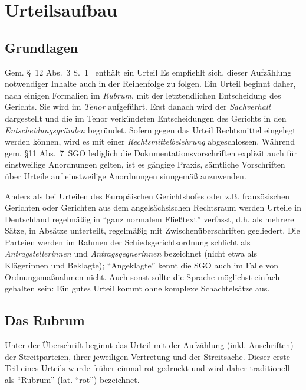 
\chapter{Urteilsaufbau}

\section{Grundlagen}
Gem. \S~12 Abs.~3 S.~1~ enthält ein Urteil  Es empfiehlt sich, dieser Aufzählung notwendiger Inhalte auch in der Reihenfolge zu folgen. Ein Urteil beginnt daher, nach einigen Formalien im \emph{Rubrum}, mit der letztendlichen Entscheidung des Gerichts. Sie wird im \emph{Tenor} aufgeführt. Erst danach wird der \emph{Sachverhalt} dargestellt und die im Tenor verkündeten Entscheidungen des Gerichts in den \emph{Entscheidungsgründen} begründet. Sofern gegen das Urteil Rechtsmittel eingelegt werden können, wird es mit einer \emph{Rechtsmittelbelehrung} abgeschlossen. Während gem. \S11 Abs.~7~SGO lediglich die Dokumentationsvorschriften explizit auch für einstweilige Anordnungen gelten, ist es gängige Praxis, sämtliche Vorschriften über Urteile auf einstweilige Anordnungen sinngemäß anzuwenden.

Anders als bei Urteilen des Europäischen Gerichtshofes oder z.B. französischen Gerichten oder Gerichten aus dem angelsächsischen Rechtsraum werden Urteile in Deutschland regelmäßig in \enquote{ganz normalem Fließtext} verfasst, d.h. als mehrere Sätze, in Absätze unterteilt, regelmäßig mit Zwischenüberschriften gegliedert. Die Parteien werden im Rahmen der Schiedsgerichtsordnung schlicht als \emph{Antragstellerinnen} und \emph{Antragsgegnerinnen} bezeichnet (nicht etwa als Klägerinnen und Beklagte); \enquote{Angeklagte} kennt die SGO auch im Falle von Ordnungsmaßnahmen nicht. Auch sonst sollte die Sprache möglichst einfach gehalten sein: Ein gutes Urteil kommt ohne komplexe Schachtelsätze aus.

\section{Das Rubrum}
Unter der Überschrift  beginnt das Urteil mit der Aufzählung (inkl. Anschriften) der Streitparteien, ihrer jeweiligen Vertretung und der Streitsache. Dieser erste Teil eines Urteils wurde früher einmal rot gedruckt und wird daher traditionell als \enquote{Rubrum} (lat. \enquote{rot}) bezeichnet.

